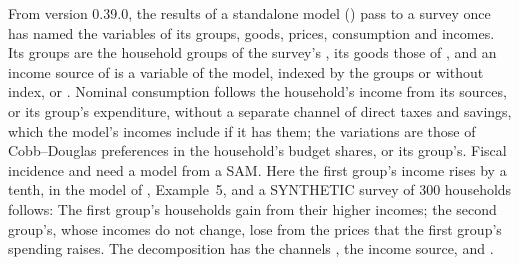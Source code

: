 
From version 0.39.0, the results of a standalone model ()
pass to a survey once  has named the variables of its
groups, goods, prices, consumption and incomes. Its groups are the household
groups of the survey's , its goods those of ,
and an income source of  is a variable of the model, indexed
by the groups or without index, or . Nominal consumption follows
the household's income from its sources, or its group's expenditure, without
a separate channel of direct taxes and savings, which the model's incomes
include if it has them; the variations are those of Cobb--Douglas
preferences in the household's budget shares, or its group's. Fiscal
incidence and  need a model from a SAM. Here the first
group's income rises by a tenth, in the model of ,
Example~5, and a SYNTHETIC survey of 300 households follows:
The first group's households gain from their higher incomes; the second
group's, whose incomes do not change, lose from the prices that the first
group's spending raises. The decomposition has the channels , the
income source, and .


